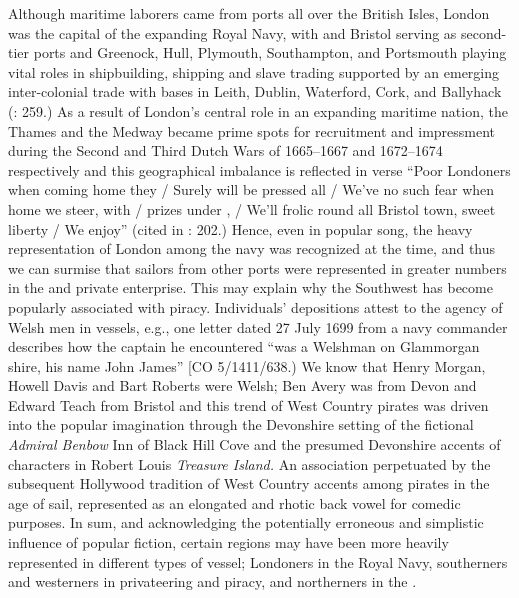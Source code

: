 Although maritime laborers came from ports all over the British Isles, London was the capital of the expanding Royal Navy, with  and Bristol serving as second-tier ports and Greenock, Hull, Plymouth, Southampton, and Portsmouth playing vital roles in shipbuilding,  shipping and slave trading supported by an emerging inter-colonial trade with bases in Leith, Dublin, Waterford, Cork, and Ballyhack (\citealt{Jarvis2010}: 259.) As a result of London’s central role in an expanding maritime nation, the Thames and the Medway became prime spots for recruitment and impressment during the Second and Third Dutch Wars of 1665--1667 and 1672--1674 respectively \citep[201,]{Earle1998} and this geographical imbalance is reflected in verse “Poor Londoners when coming home they / Surely will be pressed all / We’ve no such fear when home we steer, with / prizes under , / We’ll frolic round all Bristol town, sweet liberty / We enjoy” (cited in \citealt{Earle1998}: 202.) Hence, even in popular song, the heavy representation of London among the navy was recognized at the time, and thus we can surmise that sailors from other ports were represented in greater numbers in the  and private enterprise. This may explain why the Southwest has become popularly associated with piracy. Individuals’ depositions attest to the agency of Welsh men in  vessels, e.g., one letter dated 27 July {1699} from a navy commander describes how the  captain he encountered “was a Welshman on Glammorgan shire, his name John James” [CO 5/1411/638.) We know that Henry Morgan, Howell Davis and Bart Roberts were Welsh; Ben Avery was from Devon and Edward Teach from Bristol \citep[328,]{Bicheno2012} and this trend of West Country pirates was driven into the popular imagination through the Devonshire setting of the fictional \textit{Admiral Benbow} Inn of Black Hill Cove and the presumed Devonshire accents of characters in Robert Louis  \textit{Treasure Island.} An association perpetuated by the subsequent Hollywood tradition of West Country accents among pirates in the age of sail, represented as an elongated and rhotic back vowel for comedic purposes. In sum, and acknowledging the potentially erroneous and simplistic influence of popular fiction, certain regions may have been more heavily represented in different types of vessel; Londoners in the Royal Navy, southerners and westerners in privateering and piracy, and northerners in the . 

